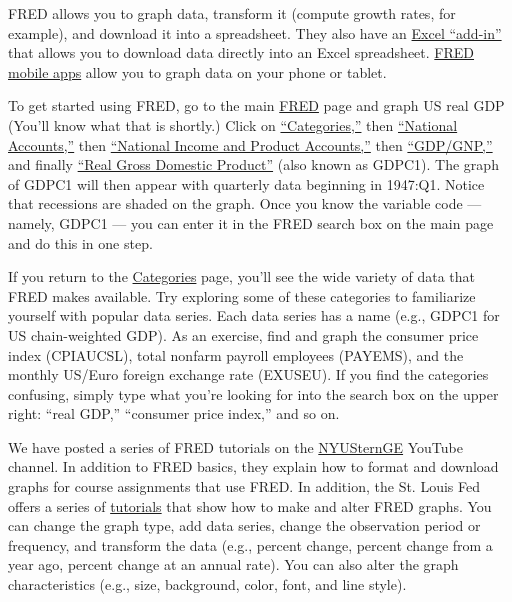 FRED  allows you to graph data, transform it (compute growth rates, for example),
 and download it into a spreadsheet.
They also have an \href{http://research.stlouisfed.org/fred-addin/}{Excel ``add-in''}
that allows you to download data directly into an Excel spreadsheet.
\href{http://research.stlouisfed.org/fred-addin/}{FRED mobile apps} allow
you to graph data on your phone or tablet.

To get started using FRED, go to the main \href{http://research.stlouisfed.org/fred2}{FRED} page
and graph US real GDP
(You'll know what that is shortly.)
Click on \href{http://research.stlouisfed.org/fred2/categories}{``Categories,''} then \href{http://research.stlouisfed.org/fred2/categories/32992}{``National Accounts,''} then \href{http://research.stlouisfed.org/fred2/categories/18}{``National Income and Product Accounts,''} then \href{http://research.stlouisfed.org/fred2/categories/106}{``GDP/GNP,''} and finally \href{http://research.stlouisfed.org/fred2/series/GDPC1?cid=106}{``Real Gross Domestic Product''}
(also known as GDPC1). The graph of GDPC1 will then appear with quarterly data beginning in 1947:Q1. Notice that recessions are shaded on the graph.
Once you know the variable code --- namely, GDPC1 --- you can enter it in the FRED search box
on the main page and do this in one step.

If you return to the \href{http://research.stlouisfed.org/fred2/categories}{Categories} page,
you'll see the wide variety of data that FRED makes available.
Try exploring some of these categories to familiarize yourself with popular data series.
Each data series has a name (e.g., GDPC1 for US chain-weighted GDP). As an exercise, find and graph the consumer price index 
 (CPIAUCSL), total nonfarm payroll employees (PAYEMS), and the monthly US/Euro foreign exchange rate (EXUSEU).
If you find the categories confusing, simply type what you're looking for into the search box
on the upper right:  ``real GDP,'' ``consumer price index,'' and so on.

We have posted a series of FRED tutorials on the
\href{http://www.youtube.com/user/NYUSternGE}{NYUSternGE}
YouTube channel.
In addition to FRED basics, they explain how to format and download graphs for course
assignments that use FRED.
In addition, the St. Louis Fed offers
a series of \href{http://research.stlouisfed.org/tutorials/fredgraph/}{tutorials}
that show how to make and alter FRED graphs.
You can change the graph type, add data series, change the observation period or frequency, and transform the data (e.g., percent change, percent change from a year ago, percent change at an annual rate). You can also alter the graph characteristics (e.g., size, background, color, font, and line style).

